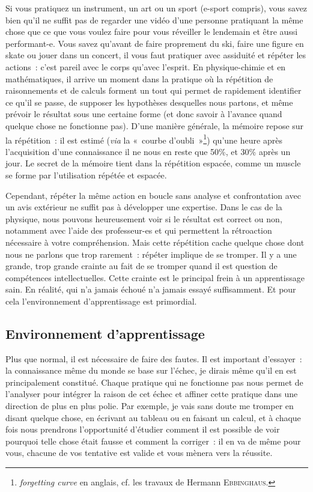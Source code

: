 \documentclass[a4paper, 10pt, final, garamond]{book}
\begin{document}
Si vous pratiquez un instrument, un art ou un sport (e-sport compris), vous
savez bien qu'il ne suffit pas de regarder une vidéo d'une personne pratiquant
la même chose que ce que vous voulez faire pour vous réveiller le lendemain et
être aussi performant-e. Vous savez qu'avant de faire proprement du ski, faire
une figure en skate ou jouer dans un concert, il vous faut pratiquer avec
assiduité et répéter les actions~: c'est pareil avec le corps qu'avec l'esprit.
En physique-chimie et en mathématiques, il arrive un moment dans la pratique où
la répétition de raisonnements et de calculs forment un tout qui permet de
rapidement identifier ce qu'il se passe, de supposer les hypothèses desquelles
nous partons, et même prévoir le résultat sous une certaine forme (et donc
savoir à l'avance quand quelque chose ne fonctionne pas). D'une manière
générale, la mémoire repose sur la répétition~: il est estimé (\textit{via} la
«~courbe d'oubli~»\footnote{\textit{forgetting curve} en anglais, cf. les
	travaux de Hermann \textsc{Ebbinghaus}.}) qu'une heure après l'acquisition
d'une connaissance il ne nous en reste que 50\%, et 30\% après un jour. Le
secret de la mémoire tient dans la répétition espacée, comme un muscle se forme
par l'utilisation répétée et espacée.

Cependant, répéter la même action en boucle sans analyse et confrontation avec
un avis extérieur ne suffit pas à développer une expertise. Dans le cas de la
physique, nous pouvons heureusement voir si le résultat est correct ou non,
notamment avec l'aide des professeur-es et qui permettent la rétroaction
nécessaire à votre compréhension. Mais cette répétition cache quelque chose dont
nous ne parlons que trop rarement~: répéter implique de se tromper. Il y a une
grande, trop grande crainte au fait de se tromper quand il est question de
compétences intellectuelles. Cette crainte est le principal frein à un
apprentissage sain. En réalité, qui n'a jamais échoué n'a jamais essayé
suffisamment. Et pour cela l'environnement d'apprentissage est primordial.

\subsection{Environnement d'apprentissage}

Plus que normal, il est nécessaire de faire des fautes. Il est important
d'essayer~: la connaissance même du monde se base sur l'échec, je dirais même
qu'il en est principalement constitué. Chaque pratique qui ne fonctionne pas
nous permet de l'analyser pour intégrer la raison de cet échec et affiner cette
pratique dans une direction de plus en plus polie. Par exemple, je vais sans
doute me tromper en disant quelque chose, en écrivant au tableau ou en faisant
un calcul, et à chaque fois nous prendrons l'opportunité d'étudier comment il
est possible de voir pourquoi telle chose était fausse et comment la corriger~:
il en va de même pour vous, chacune de vos tentative est valide et vous mènera
vers la réussite.
\end{document}
